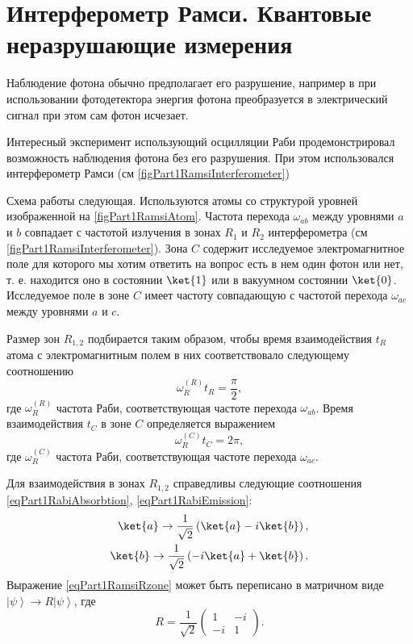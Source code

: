 \section{Интерферометр Рамси. Квантовые неразрушающие измерения}

Наблюдение фотона  обычно предполагает его разрушение, например в
при использовании фотодетектора энергия фотона преобразуется в
электрический сигнал при этом сам фотон исчезает.

Интересный эксперимент \cite{Nogues1999Nv400p239} использующий
осцилляции Раби продемонстрировал возможность наблюдения фотона без
его разрушения. При этом использовался интерферометр Рамси (см
\autoref{figPart1RamsiInterferometer})





Схема работы следующая. Используются атомы со структурой уровней
изображенной на \autoref{figPart1RamsiAtom}. Частота перехода
$\omega_{ab}$ между уровнями $a$ и $b$ совпадает с частотой излучения
в зонах $R_1$ и $R_2$ интерферометра  (см
\autoref{figPart1RamsiInterferometer}). Зона $C$ содержит исследуемое
электромагнитное поле для которого мы хотим ответить на вопрос есть в
нем один фотон или нет, т. е. находится оно в состоянии
$\ket{1}$ или в вакуумном состоянии
$\ket{0}$. Исследуемое поле в зоне $C$ имеет частоту
совпадающую с частотой перехода $\omega_{ac}$ между уровнями $a$ и
$c$.  

Размер зон $R_{1,2}$ подбирается таким образом, чтобы время
взаимодействия $t_R$ атома с электромагнитным полем в них соответствовало
следующему соотношению
\begin{equation}
  \omega_R^{(R)} t_R = \frac{\pi}{2},
  \nonumber
\end{equation}
где $\omega_R^{(R)}$ частота Раби, соответствующая частоте перехода
$\omega_{ab}$.
Время взаимодействия $t_C$ в зоне $C$ определяется выражением
\begin{equation}
  \omega_R^{(C)} t_C = 2 \pi,
  \nonumber
\end{equation}
где $\omega_R^{(C)}$ частота Раби, соответствующая частоте перехода
$\omega_{ac}$.

Для взаимодействия в зонах $R_{1,2}$ справедливы следующие
соотношения \eqref{eqPart1RabiAbsorbtion}, \ref{eqPart1RabiEmission}:
\begin{eqnarray}
  \ket{a} \rightarrow \frac{1}{\sqrt{2}}\left(
  \ket{a} - i \ket{b}  
  \right),
  \nonumber \\
  \ket{b} \rightarrow \frac{1}{\sqrt{2}}\left(
  -i \ket{a} + \ket{b}  
  \right).
  \label{eqPart1RamsiRzone}
\end{eqnarray}
Выражение \eqref{eqPart1RamsiRzone} может быть переписано в матричном
виде $\left|\psi\right> \rightarrow R \left|\psi\right>$,
где
\[
R = \frac{1}{\sqrt{2}} \left(
\begin{array} {cc}
1 & -i
\\
-i & 1 
\end{array}
\right).
\]

